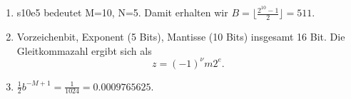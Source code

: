 \begin{enumerate}
	\item s10e5 bedeutet M=10, N=5. Damit erhalten wir 
	$B = \lfloor \frac{2^{10}-1}{2}\rfloor = 511$.
	\item Vorzeichenbit, Exponent (5 Bits), Mantisse (10 Bits) insgesamt 16 Bit. Die Gleitkommazahl ergibt sich als 
	$$
		z = (-1)^{\nu} m 2^e.
	$$
	\item $\frac{1}{2} b^{-M+1} = \frac{1}{1024} = 0.0009765625$.
\end{enumerate}

